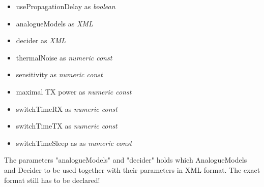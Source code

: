 \begin{itemize}
\item usePropagationDelay as \textit{boolean}
\item analogueModels as \textit{XML}
\item decider as \textit{XML}
\item thermalNoise as \textit{numeric const}
\item sensitivity as \textit{numeric const}
\item maximal TX power as \textit{numeric const}
\item switchTimeRX as \textit{numeric const}
\item switchTimeTX as \textit{numeric const}
\item switchTimeSleep as as \textit{numeric const}
\end{itemize}

The parameters "analogueModels" and "decider" holds which AnalogueModels and
Decider to be used together with their parameters in XML format. The exact
format still has to be declared!








